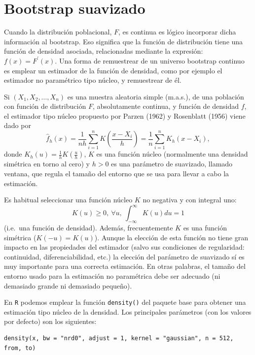 \documentclass[
  spanish,
  10pt,
]{book}
\theoremstyle{break}
\theoremstyle{nonumberplain}
\begin{document}
\section{Bootstrap suavizado}\label{modunif-boot-suav}

Cuando la distribución poblacional, \(F\), es continua es lógico incorporar dicha información al bootstrap.
Eso significa que la función de distribución tiene una función de densidad asociada, relacionadas mediante la expresión: \(f(x) =F^{\prime}(x)\).
Una forma de remuestrear de un universo bootstrap continuo es emplear un estimador de la función de densidad, como por ejemplo el estimador no paramétrico tipo núcleo, y remuestrear de él.

Si \(\left( X_1, X_2, \ldots, X_n \right)\) es una muestra aleatoria simple (m.a.s.), de una población con función de distribución \(F\), absolutamente continua, y función de densidad \(f\), el estimador tipo núcleo propuesto por Parzen (1962) y Rosenblatt (1956) viene dado por
\[\hat{f}_{h}\left( x \right) =\frac{1}{nh}\sum_{i=1}^{n}K\left( \frac{x-X_i}{h} \right) =\frac{1}{n}\sum_{i=1}^{n}K_{h}\left( x-X_i \right),\]
donde \(K_{h}\left( u \right) =\frac{1}{h}K\left( \frac{u}{h} \right)\), \(K\) es una función núcleo (normalmente una densidad simétrica en torno al cero) y \(h>0\) es una parámetro de suavizado, llamado ventana, que regula el tamaño del entorno que se usa para llevar a cabo la estimación.

Es habitual seleccionar una función núcleo \(K\) no negativa y con integral uno:
\[K\left( u \right) \geq 0,~\forall u,~\int_{-\infty }^{\infty }
K\left( u \right) du=1\]
(i.e.~una función de densidad).
Además, frecuentemente \(K\) es una función simétrica (\(K\left( -u \right) =K\left( u \right)\)).
Aunque la elección de esta función no tiene gran impacto en las propiedades del estimador (salvo sus condiciones de regularidad: continuidad, diferenciabilidad, etc.) la elección del parámetro de suavizado sí es muy importante para una correcta estimación.
En otras palabras, el tamaño del entorno usado para la estimación no paramétrica debe ser adecuado (ni demasiado grande ni demasiado pequeño).

En \texttt{R} podemos emplear la función \texttt{density()} del paquete base para obtener
una estimación tipo núcleo de la densidad.
Los principales parámetros (con los valores por defecto) son los siguientes:

\begin{verbatim}
density(x, bw = "nrd0", adjust = 1, kernel = "gaussian", n = 512, from, to)
\end{verbatim}
\end{document}
